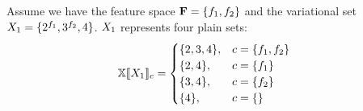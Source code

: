 \begin{example}
\label{eg:vset-conf}
Assume we have the feature space $\fSet = \setDef {\A, \B}$ 
and the variational set $\vset_1 = \setDef {\annot [\A] 2, \annot [\B] 3, 4}$.
$\vset_1$ represents four plain sets:
\begin{alignat*}{1}
\osetSem {\vset_1} &=
\begin{cases}
  \setDef{2,3,4}, & \config = \setDef{\A,\B}\\
  \setDef{2,4}, & \config = \setDef{\A}\\
  \setDef{3,4}, & \config = \setDef{\B}\\
  \setDef{4}, & \config = \setDef { }
\end{cases}
\end{alignat*}
\end{example}
